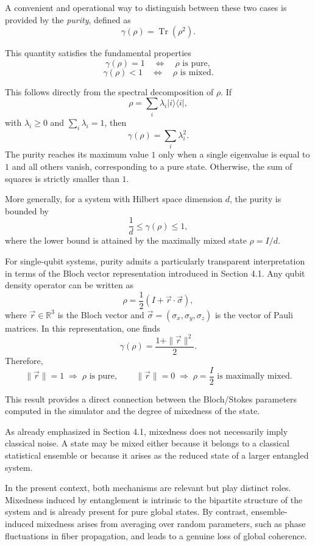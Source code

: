 \documentclass[a4paper]{article}
\begin{document}
A convenient and operational way to distinguish between these two cases is provided by the \emph{purity}, defined as
\[
\gamma(\rho) = \operatorname{Tr}(\rho^2).
\]

This quantity satisfies the fundamental properties
\[
\gamma(\rho) = 1 \quad \Longleftrightarrow \quad \rho \text{ is pure},
\]
\[
\gamma(\rho) < 1 \quad \Longleftrightarrow \quad \rho \text{ is mixed}.
\]

This follows directly from the spectral decomposition of $\rho$. If
\[
\rho = \sum_i \lambda_i |i\rangle \langle i|,
\]
with $\lambda_i \ge 0$ and $\sum_i \lambda_i = 1$, then
\[
\gamma(\rho) = \sum_i \lambda_i^2.
\]
The purity reaches its maximum value $1$ only when a single eigenvalue is equal to $1$ and all others vanish, corresponding to a pure state. Otherwise, the sum of squares is strictly smaller than $1$.

More generally, for a system with Hilbert space dimension $d$, the purity is bounded by
\[
\frac{1}{d} \le \gamma(\rho) \le 1,
\]
where the lower bound is attained by the maximally mixed state $\rho = I/d$.

\medskip

For single-qubit systems, purity admits a particularly transparent interpretation in terms of the Bloch vector representation introduced in Section 4.1. Any qubit density operator can be written as
\[
\rho = \frac{1}{2}\left(I + \vec{r} \cdot \vec{\sigma}\right),
\]
where $\vec{r} \in \mathbb{R}^3$ is the Bloch vector and $\vec{\sigma} = (\sigma_x, \sigma_y, \sigma_z)$ is the vector of Pauli matrices. In this representation, one finds
\[
\gamma(\rho) = \frac{1 + \|\vec{r}\|^2}{2}.
\]
Therefore,
\[
\|\vec{r}\| = 1 \;\Rightarrow\; \rho \text{ is pure},
\qquad
\|\vec{r}\| = 0 \;\Rightarrow\; \rho = \frac{I}{2} \text{ is maximally mixed}.
\]

This result provides a direct connection between the Bloch/Stokes parameters computed in the simulator and the degree of mixedness of the state.

\medskip

As already emphasized in Section 4.1, mixedness does not necessarily imply classical noise. A state
may be mixed either because it belongs to a classical statistical ensemble or because it arises as
the reduced state of a larger entangled system.

In the present context, both mechanisms are relevant but play distinct roles. Mixedness induced by
entanglement is intrinsic to the bipartite structure of the system and is already present for pure
global states. By contrast, ensemble-induced mixedness arises from averaging over random parameters,
such as phase fluctuations in fiber propagation, and leads to a genuine loss of global coherence.
\end{document}
